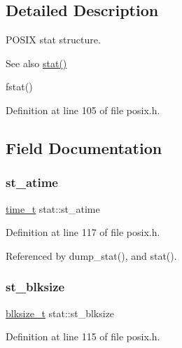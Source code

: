\subsection{Detailed Description}
P\+O\+S\+IX stat structure. 

\begin{DoxySeeAlso}{See also}
\hyperlink{posix_8c_abef70bf7a4af8a1f4998db0035c51781}{stat()} 

fstat() 
\end{DoxySeeAlso}


Definition at line 105 of file posix.\+h.



\subsection{Field Documentation}
\mbox{\label{structstat_ab74d1e7e345e88b9d0fb2688a97cba64}} 
\subsubsection{\texorpdfstring{st\+\_\+atime}{st\_atime}}
{\footnotesize\ttfamily \hyperlink{time_8h_a3346b04b0420b32ccf6b706551b70762}{time\+\_\+t} stat\+::st\+\_\+atime}



Definition at line 117 of file posix.\+h.



Referenced by dump\+\_\+stat(), and stat().

\mbox{\label{structstat_a38d474e1ae3cf6fbdde89ac3c3e308f1}} 
\subsubsection{\texorpdfstring{st\+\_\+blksize}{st\_blksize}}
{\footnotesize\ttfamily \hyperlink{posix_8h_a390f3028d0805a15c3d28ee27439c389}{blksize\+\_\+t} stat\+::st\+\_\+blksize}



Definition at line 115 of file posix.\+h.

\mbox{\label{structstat_a42dd716b2f9234f961d949fc9500eefb}} 
